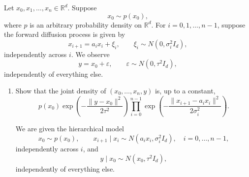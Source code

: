 \documentclass[answers,12pt,addpoints]{exam}
\begin{document}
Let $x_0, x_1, \ldots, x_n \in \mathbb{R}^d$. Suppose
\[
x_0 \sim p(x_0),
\]
where $p$ is an arbitrary probability density on $\mathbb{R}^d$. For $i = 0,1,\ldots,n-1$, suppose the forward diffusion process is given by
\[
x_{i+1} = a_i x_i + \xi_i, \qquad \xi_i \sim N(0, \sigma_i^2 I_d),
\]
independently across $i$. We observe
\[
y = x_0 + \varepsilon, \qquad \varepsilon \sim N(0, \tau^2 I_d),
\]
independently of everything else.

\begin{enumerate}
    \item Show that the joint density of $(x_0, \ldots, x_n, y)$ is, up to a constant,
    \[
    p(x_0)
    \exp\!\left(
        -\frac{\|y - x_0\|^2}{2\tau^2}
    \right)
    \prod_{i=0}^{n-1}
    \exp\!\left(
        -\frac{\|x_{i+1} - a_i x_i\|^2}{2\sigma_i^2}
    \right).
    \]
    \begin{solution}
        We are given the hierarchical model
\[
x_0 \sim p(x_0), \qquad
x_{i+1} \mid x_i \sim N(a_i x_i,\sigma_i^2 I_d), \quad i=0,\dots,n-1,
\]
independently across $i$, and
\[
y \mid x_0 \sim N(x_0,\tau^2 I_d),
\]
independently of everything else.


\end{solution}
\end{enumerate}
\end{document}
